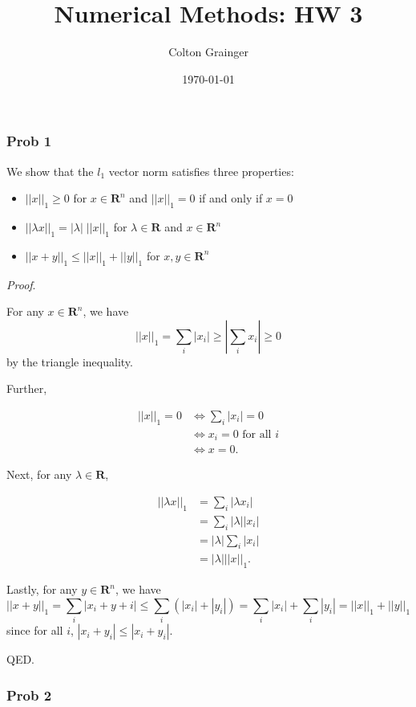 \documentclass[titlepage,11pt]{article}
\providecommand{\tightlist}{%
      \setlength{\itemsep}{0pt}\setlength{\parskip}{0pt}}
\begin{document}
\title{Numerical Methods: HW 3}
\date{\today}
\author{Colton Grainger}
\maketitle
    \subsubsection{Prob 1}\label{prob-1}

We show that the \(l_{1}\) vector norm satisfies three properties:

\begin{itemize}
\tightlist
\item
  \(||x||_1\geq 0\) for \(x \in \mathbf{R}^n\) and \(||x||_1= 0\) if and
  only if \(x=0\)
\item
  \(|| \lambda x||_1 = | \lambda | \; ||x||_1\) for
  \(\lambda \in \mathbf{R}\) and \(x \in \mathbf{R}^n\)
\item
  \(|| x + y||_1 \leq ||x||_1+||y||_1\) for \(x,y \in \mathbf{R}^n\)
\end{itemize}

\emph{Proof}.

For any \(x \in \mathbf{R}^n\), we have
\[||x||_1 = \sum_i |x_i| \geq |\sum_i x_i | \geq 0\] by the triangle
inequality.

Further,

\begin{align*}
  ||x||_1 = 0 &\iff \sum_i |x_i| = 0\\
    &\iff x_i = 0 \text{ for all } i\\
    &\iff x = 0.
\end{align*}

Next, for any \(\lambda \in \mathbf{R}\),

\begin{align*}
  ||\lambda x||_1 &= \sum_i |\lambda x_i|\\
    &= \sum_i |\lambda| |x_i|\\
    &= |\lambda| \sum_i |x_i|\\
    &= |\lambda| ||x||_1.
\end{align*}

Lastly, for any \(y \in \mathbf{R}^n\), we have
\[||x+y||_1 = \sum_i |x_i + y+i| \leq \sum_i (|x_i| + |y_i|) = \sum_i |x_i| + \sum_i |y_i| = ||x||_1 + ||y||_1\]
since for all \(i\), \(|x_i + y_i| \leq |x_i + y_i|\).

QED.

    \subsubsection{Prob 2}\label{prob-2}
\end{document}

